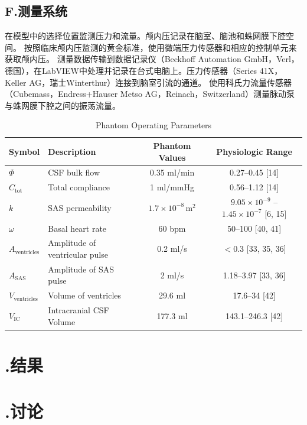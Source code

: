 \documentclass[12pt]{article}
\begin{document}
\subsection*{F.测量系统}
在模型中的选择位置监测压力和流量。颅内压记录在脑室、脑池和蛛网膜下腔空间。
按照临床颅内压监测的黄金标准，使用微端压力传感器和相应的控制单元来获取颅内压。
测量数据传输到数据记录仪（Beckhoff Automation GmbH，Verl，德国），在LabVIEW中处理并记录在台式电脑上。压力传感器（Series 41X，Keller AG，瑞士Winterthur）连接到脑室引流的通道。
使用科氏力流量传感器（Cubemass，Endress+Hauser Metso AG，Reinach，Switzerland）测量脉动泵与蛛网膜下腔之间的振荡流量。
\begin{table}[h!]
    \centering
    \caption{Phantom Operating Parameters}
    \renewcommand{\arraystretch}{1.5} %
    \begin{tabular}{l l c c}
    \toprule
    \textbf{Symbol} & \textbf{Description}                & \textbf{Phantom Values} & \textbf{Physiologic Range} \\ 
    \midrule
    $\Phi$          & CSF bulk flow                      & 0.35 ml/min             & 0.27--0.45 [14]            \\ 
    $C_{\text{tot}}$& Total compliance                   & 1 ml/mmHg               & 0.56--1.12 [14]            \\ 
    $k$             & SAS permeability                   & $1.7 \times 10^{-8} \, \text{m}^2$ & $9.05 \times 10^{-9}$ -- $1.45 \times 10^{-7}$ [6, 15] \\ 
    $\omega$        & Basal heart rate                   & 60 bpm                  & 50--100 [40, 41]           \\ 
    $A_{\text{ventricles}}$ 
                    & Amplitude of ventricular pulse     & 0.2 ml/s                & $<0.3$ [33, 35, 36]        \\ 
    $A_{\text{SAS}}$ 
                    & Amplitude of SAS pulse             & 2 ml/s                  & 1.18--3.97 [33, 36]        \\ 
    $V_{\text{ventricles}}$ 
                    & Volume of ventricles               & 29.6 ml                 & 17.6--34 [42]              \\ 
    $V_{\text{IC}}$ & Intracranial CSF Volume            & 177.3 ml                & 143.1--246.3 [42]          \\ 
    \bottomrule
    \end{tabular}
    \label{table:phantom_parameters}
\end{table}

\section*{\uppercase\expandafter{}.结果}

\section*{\uppercase\expandafter{}.讨论}
\end{document}
